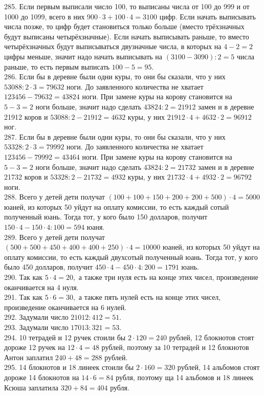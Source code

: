 \documentclass[12pt]{article}
\begin{document}
285. Если первым выписали число 100, то выписаны числа от 100 до 999 и от 1000 до 1099, всего в них $900\cdot3+100\cdot4=3100$ цифр. Если начать выписывать числа позже, то цифр будет становиться только больше (вместо трёхзначных будут выписаны четырёхзначные). Если начать выписывать раньше, то вместо четырёхзначных будут выписываться двузначные числа, в которых на $4-2=2$ цифры меньше, значит надо начать выписывать на $(3100-3090):2=5$ числа раньше, то есть первым выписать $100-5=95.$\\
286. Если бы в деревне были одни куры, то они бы сказали, что у них $53088:2\cdot3=79632$ ноги. До заявленного количества не хватает $123456-79632=43824$ ноги. При замене куры на корову становится на $5-3=2$ ноги больше, значит надо сделать $43824:2=21912$ замен и в деревне 21912 коров и $53088:2-21912=4632$ куры, у них $21912\cdot4+4632\cdot2=96912$ ног.\\
287. Если бы в деревне были одни куры, то они бы сказали, что у них $53328:2\cdot3=79992$ ноги. До заявленного количества не хватает $123456-79992=43464$ ноги. При замене куры на корову становится на $5-3=2$ ноги больше, значит надо сделать $43824:2=21732$ замен и в деревне 21732 коров и $53328:2-21732=4932$ куры, у них $21732\cdot4+4932\cdot2=96792$ ноги.\\
288. Всего у детей дети получат $(100+100+150+200+200+500)\cdot4=5000$ юаней, из которых 50 уйдут на оплату комиссии, то есть каждый сотый полученный юань. Тогда тот, у кого было 150 долларов, получит $150\cdot4-150\cdot4:100=594$ юаня.\\
289. Всего у детей дети получат $(500+500+450+400+400+250)\cdot4=10000$ юаней, из которых 50 уйдут на оплату комиссии, то есть каждый двухсотый полученный юань. Тогда тот, у кого было 450 долларов, получит $450\cdot4-450\cdot4:200=1791$ юань.\\
290. Так как $5\cdot4=20,$ а также три нуля есть на конце этих чисел, произведение оканчивается на 4 нуля.\\
291. Так как $5\cdot6=30,$ а также пять нулей есть на конце этих чисел, произведение оканчивается на 6 нулей.\\
292. Задумали число $21012:412=51.$\\
293. Задумали число $17013:321=53.$\\
294. 10 тетрадей и 12 ручек стоили бы $2\cdot120=240$ рублей, 12 блокнотов стоят дороже 12 ручек на $12\cdot4=48$ рублей, поэтому за 10 тетрадей и 12 блокнотов Антон заплатил $240+48=288$ рублей.\\
295. 14 блокнотов и 18 линеек стоили бы $2\cdot160=320$ рублей, 14 альбомов стоят дороже 14 блокнотов на $14\cdot6=84$ рубля, поэтому ща 14 альбомов и 18 линеек Ксюша заплатила $320+84=404$ рубля.\\
\end{document}
